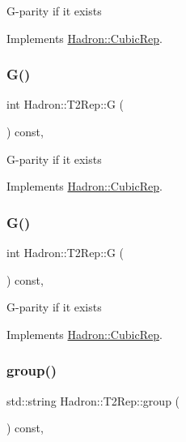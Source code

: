 G-\/parity if it exists 

Implements \mbox{\hyperlink{structHadron_1_1CubicRep_a52104e43266d1614c00bbd1c3b395458}{Hadron\+::\+Cubic\+Rep}}.

\mbox{\label{structHadron_1_1T2Rep_a909c7165132829f8e1b837f7afa00e61}} 
\subsubsection{\texorpdfstring{G()}{G()}\hspace{0.1cm}{\footnotesize\ttfamily [2/3]}}
{\footnotesize\ttfamily int Hadron\+::\+T2\+Rep\+::G (\begin{DoxyParamCaption}{ }\end{DoxyParamCaption}) const\hspace{0.3cm}{\ttfamily [inline]}, {\ttfamily [virtual]}}

G-\/parity if it exists 

Implements \mbox{\hyperlink{structHadron_1_1CubicRep_a52104e43266d1614c00bbd1c3b395458}{Hadron\+::\+Cubic\+Rep}}.

\mbox{\label{structHadron_1_1T2Rep_a909c7165132829f8e1b837f7afa00e61}} 
\subsubsection{\texorpdfstring{G()}{G()}\hspace{0.1cm}{\footnotesize\ttfamily [3/3]}}
{\footnotesize\ttfamily int Hadron\+::\+T2\+Rep\+::G (\begin{DoxyParamCaption}{ }\end{DoxyParamCaption}) const\hspace{0.3cm}{\ttfamily [inline]}, {\ttfamily [virtual]}}

G-\/parity if it exists 

Implements \mbox{\hyperlink{structHadron_1_1CubicRep_a52104e43266d1614c00bbd1c3b395458}{Hadron\+::\+Cubic\+Rep}}.

\mbox{\label{structHadron_1_1T2Rep_a88eec3e9213490d2f0df4e27ecb97072}} 
\subsubsection{\texorpdfstring{group()}{group()}\hspace{0.1cm}{\footnotesize\ttfamily [1/3]}}
{\footnotesize\ttfamily std\+::string Hadron\+::\+T2\+Rep\+::group (\begin{DoxyParamCaption}{ }\end{DoxyParamCaption}) const\hspace{0.3cm}{\ttfamily [inline]}, {\ttfamily [virtual]}}

